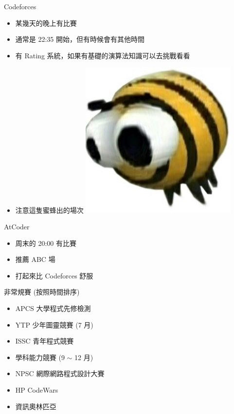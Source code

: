 \documentclass[aspectratio=169]{beamer}
\begin{document}
	\begin{frame}{Codeforces}
		\begin{itemize}
			\item 某幾天的晚上有比賽
			\item 通常是 22:35 開始，但有時候會有其他時間
			\item 有 Rating 系統，如果有基礎的演算法知識可以去挑戰看看
			\item 注意這隻蜜蜂出的場次
			\includegraphics[height=0.4\textheight]{src/antontrygubO_o.jpg}
		\end{itemize}
	\end{frame}

	\begin{frame}{AtCoder}
		\begin{itemize}
			\item 周末的 20:00 有比賽
			\item 推薦 ABC 場
			\item 打起來比 Codeforces 舒服
		\end{itemize}
	\end{frame}

	\begin{frame}{非常規賽 (按照時間排序)}
		\begin{itemize}
			\item APCS 大學程式先修檢測
			\item YTP 少年圖靈競賽 (7 月)
			\item ISSC 青年程式競賽
			\item 學科能力競賽 (9 $\sim$ 12 月)
			\item NPSC 網際網路程式設計大賽
			\item HP CodeWars
			\item 資訊奧林匹亞
		\end{itemize}
	\end{frame}
\end{document}
